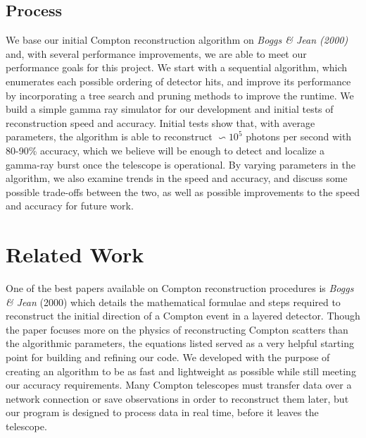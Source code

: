 \subsection{Process}
We base our initial Compton reconstruction algorithm on \emph{Boggs \& Jean (2000)}\cite{Boggs} and, with several performance improvements, we are able to meet our performance goals for this project. We start with a sequential algorithm, which enumerates each possible ordering of detector hits, and improve its performance by incorporating a tree search and pruning methods to improve the runtime. We build a simple gamma ray simulator for our development and initial tests of reconstruction speed and accuracy. Initial tests show that, with average parameters, the algorithm is able to reconstruct $\backsim 10^5$ photons per second with 80-90\% accuracy, which we believe will be enough to detect and localize a gamma-ray burst once the telescope is operational. By varying parameters in the algorithm, we also examine trends in the speed and accuracy, and discuss some possible trade-offs between the two, as well as possible improvements to the speed and accuracy for future work.

\section{Related Work}
One of the best papers available on Compton reconstruction procedures is \emph{Boggs \& Jean} (2000)\cite{Boggs} which details the mathematical formulae and steps required to reconstruct the initial direction of a Compton event in a layered detector. Though the paper focuses more on the physics of reconstructing Compton scatters than the algorithmic parameters, the equations listed served as a very helpful starting point for building and refining our code. We developed with the purpose of creating an algorithm to be as fast and lightweight as possible while still meeting our accuracy requirements. Many Compton telescopes must transfer data over a network connection or save observations in order to reconstruct them later, but our program is designed to process data in real time, before it leaves the telescope.

